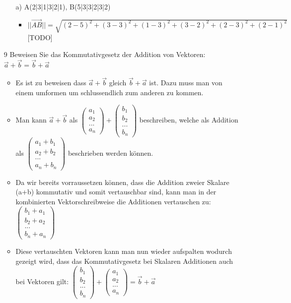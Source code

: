 \documentclass{article}
\begin{document}
\begin{itemize}
\begin{itemize}
			\item[a)]{A(2|3|1|3|2|1), B(5|3|3|2|3|2)}
			\begin{itemize}
				\item{$||\overrightarrow{AB}||=\sqrt{(2-5)^2+(3-3)^2+(1-3)^2+(3-2)^2+(2-3)^2+(2-1)^2}$ [TODO]}
			\end{itemize}
		\end{itemize}
		\item[9]{Beweisen Sie das Kommutativgesetz der Addition von Vektoren: $\vec{a}+\vec{b}=\vec{b}+\vec{a}$}
		\begin{itemize}
			\item{Es ist zu beweisen dass $\vec{a}+\vec{b}$ gleich $\vec{b}+\vec{a}$ ist. Dazu muss man von einem umformen um schlussendlich zum anderen zu kommen.}
			\item{Man kann $\vec{a}+\vec{b}$ als $\begin{pmatrix} a_1 \\ a_2 \\ ... \\ a_n \end{pmatrix}+\begin{pmatrix} b_1 \\ b_2 \\ ... \\ b_n \end{pmatrix}$ beschreiben, welche als Addition als $\begin{pmatrix} a_1 + b_1 \\  a_2 + b_2 \\ ... \\ a_n + b_n \end{pmatrix}$ beschrieben werden können.}
			\item{Da wir bereits vorraussetzen können, dass die Addition zweier Skalare (a+b) kommutativ und somit vertauschbar sind, kann man in der kombinierten Vektorschreibweise die Additionen vertauschen zu: $\begin{pmatrix} b_1 + a_1 \\  b_2 + a_2 \\ ... \\ b_n + a_n \end{pmatrix}$}
			\item{Diese vertauschten Vektoren kann man nun wieder aufspalten wodurch gezeigt wird, dass das Kommutativgesetz bei Skalaren Additionen auch bei Vektoren gilt: $\begin{pmatrix} b_1 \\ b_2 \\ ... \\ b_n \end{pmatrix}+\begin{pmatrix} a_1 \\ a_2 \\ ... \\ a_n \end{pmatrix}=\vec{b}+\vec{a}$}

\end{itemize}
\end{itemize}
\end{document}
